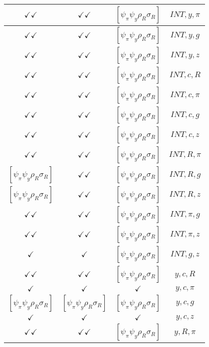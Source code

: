 \documentclass[a4paper,10pt]{article}
\begin{document}
\begin{longtable}{|c|c|c|c|}
\hline
$\checkmark\checkmark$ & $\checkmark\checkmark$ & $[\psi_\pi \psi_y \rho_R \sigma_R ]$ & ${INT},{y},{\pi}$ \\
\hline
$\checkmark\checkmark$ & $\checkmark\checkmark$ & $[\psi_\pi \psi_y \rho_R \sigma_R ]$ & ${INT},{y},{g}$ \\
\hline
$\checkmark\checkmark$ & $\checkmark\checkmark$ & $[\psi_\pi \psi_y \rho_R \sigma_R ]$ & ${INT},{y},{z}$ \\
\hline
$\checkmark\checkmark$ & $\checkmark\checkmark$ & $[\psi_\pi \psi_y \rho_R \sigma_R ]$ & ${INT},{c},{R}$ \\
\hline
$\checkmark\checkmark$ & $\checkmark\checkmark$ & $[\psi_\pi \psi_y \rho_R \sigma_R ]$ & ${INT},{c},{\pi}$ \\
\hline
$\checkmark\checkmark$ & $\checkmark\checkmark$ & $[\psi_\pi \psi_y \rho_R \sigma_R ]$ & ${INT},{c},{g}$ \\
\hline
$\checkmark\checkmark$ & $\checkmark\checkmark$ & $[\psi_\pi \psi_y \rho_R \sigma_R ]$ & ${INT},{c},{z}$ \\
\hline
$\checkmark\checkmark$ & $\checkmark\checkmark$ & $[\psi_\pi \psi_y \rho_R \sigma_R ]$ & ${INT},{R},{\pi}$ \\
\hline
$[\psi_\pi \psi_y \rho_R \sigma_R ]$ & $\checkmark\checkmark$ & $[\psi_\pi \psi_y \rho_R \sigma_R ]$ & ${INT},{R},{g}$ \\
\hline
$[\psi_\pi \psi_y \rho_R \sigma_R ]$ & $\checkmark\checkmark$ & $[\psi_\pi \psi_y \rho_R \sigma_R ]$ & ${INT},{R},{z}$ \\
\hline
$\checkmark\checkmark$ & $\checkmark\checkmark$ & $[\psi_\pi \psi_y \rho_R \sigma_R ]$ & ${INT},{\pi},{g}$ \\
\hline
$\checkmark\checkmark$ & $\checkmark\checkmark$ & $[\psi_\pi \psi_y \rho_R \sigma_R ]$ & ${INT},{\pi},{z}$ \\
\hline
$\checkmark$ & $\checkmark$ & $[\psi_\pi \psi_y \rho_R \sigma_R ]$ & ${INT},{g},{z}$ \\
\hline
$\checkmark\checkmark$ & $\checkmark\checkmark$ & $[\psi_\pi \psi_y \rho_R \sigma_R ]$ & ${y},{c},{R}$ \\
\hline
$\checkmark$ & $\checkmark$ & $\checkmark$ & ${y},{c},{\pi}$ \\
\hline
$[\psi_\pi \psi_y \rho_R \sigma_R ]$ & $[\psi_\pi \psi_y \rho_R \sigma_R ]$ & $[\psi_\pi \psi_y \rho_R \sigma_R ]$ & ${y},{c},{g}$ \\
\hline
$\checkmark$ & $\checkmark$ & $\checkmark$ & ${y},{c},{z}$ \\
\hline
$\checkmark\checkmark$ & $\checkmark\checkmark$ & $[\psi_\pi \psi_y \rho_R \sigma_R ]$ & ${y},{R},{\pi}$ \\

\end{longtable}
\end{document}
